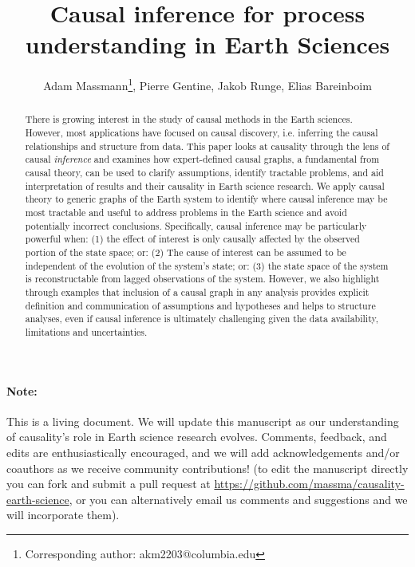 \documentclass[12pt]{article}
\begin{document}
\title{Causal inference for process understanding in Earth Sciences}

\author{Adam Massmann\thanks{Corresponding author:
    akm2203@columbia.edu}, Pierre Gentine, Jakob Runge, Elias Bareinboim}

\maketitle
\begin{abstract}
  There is growing interest in the study of causal methods in the
  Earth sciences. However, most applications have focused on causal
  discovery, i.e. inferring the causal relationships and structure
  from data. This paper looks at causality through the lens of causal
  {\it inference} and examines how expert-defined causal graphs, a
  fundamental from causal theory, can be used to clarify assumptions,
  identify tractable problems, and aid interpretation of results and
  their causality in Earth science research. We apply causal theory to
  generic graphs of the Earth system to identify where causal
  inference may be most tractable and useful to address problems in
  the Earth science and avoid potentially incorrect
  conclusions. Specifically, causal inference may be particularly
  powerful when: (1) the effect of interest is only causally affected
  by the observed portion of the state space; or: (2) The cause of
  interest can be assumed to be independent of the evolution of the
  system’s state; or: (3) the state space of the system is
  reconstructable from lagged observations of the system. However, we
  also highlight through examples that inclusion of a causal graph in
  any analysis provides explicit definition and communication of
  assumptions and hypotheses and helps to structure analyses, even if
  causal inference is ultimately challenging given the data
  availability, limitations and uncertainties.
\end{abstract}

\paragraph{Note:} This is a living document. We will update this
manuscript as our understanding of causality's role in Earth science
research evolves. Comments, feedback, and edits are enthusiastically
encouraged, and we will add acknowledgements and/or coauthors as we
receive community contributions! (to edit the manuscript directly you
can fork and submit a pull request at
\url{https://github.com/massma/causality-earth-science}, or you can
alternatively email us comments and suggestions and we will
incorporate them).
\end{document}
